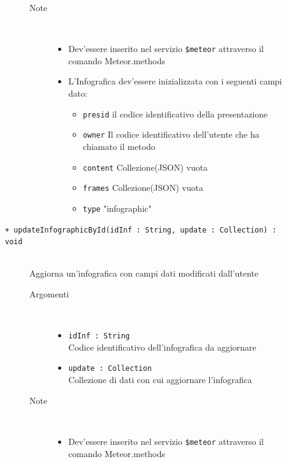 \begin{description}
\begin{description}
\begin{description}
\begin{itemize}
				\end{itemize}
			\item[Note] \hfill \\
			\begin{itemize}
					\item Dev'essere inserito nel servizio \texttt{\$meteor} attraverso il comando Meteor.methods
					\item L'Infografica dev'essere inizializzata con i seguenti campi dato:
					\begin{itemize}
					\item \texttt{presid} il codice identificativo della presentazione
					\item \texttt{owner} Il codice identificativo dell'utente che ha chiamato il metodo
					\item \texttt{content} Collezione(JSON) vuota
					\item \texttt{frames} Collezione(JSON) vuota
					\item \texttt{type} "infographic"
					\end{itemize}
				\end{itemize}
		\end{description}
	\end{description}
	
	\begin{description}
		\item[\texttt{+ updateInfographicById(idInf : String, update : Collection) : void			}] \hfill \\
			Aggiorna un'infografica con campi dati modificati dall'utente
			
		\begin{description}
			\item[Argomenti] \hfill \\
				\begin{itemize}
				
					\item \texttt{idInf : String			} \hfill \\
					Codice identificativo dell'infografica da aggiornare
					\item \texttt{update : Collection			} \hfill \\
					Collezione di dati con cui aggiornare l'infografica
					
				\end{itemize}
			\item[Note] \hfill \\
			\begin{itemize}
					\item Dev'essere inserito nel servizio \texttt{\$meteor} attraverso il comando Meteor.methods
				\end{itemize}
		\end{description}
	\end{description}
	

\end{description}
